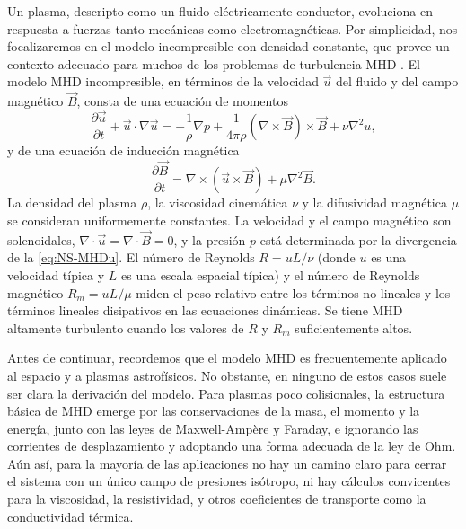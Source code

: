 Un plasma, descripto como un fluido eléctricamente conductor,
evoluciona en respuesta a fuerzas tanto mecánicas como
electromagnéticas. Por simplicidad, nos focalizaremos en el modelo
incompresible con densidad constante, que provee un contexto adecuado
para muchos de los problemas de turbulencia MHD
\cite{biskamp_magnetohydrodynamic_2003}. El modelo MHD incompresible,
en términos de la velocidad $\vec{u}$ del fluido y del campo magnético
$\vec{B}$, consta de una ecuación de momentos
\begin{equation}\label{eq:NS-MHDu}
  \frac{\partial \vec{u}}{\partial t} + \vec{u} \cdot \nabla\vec{u} = -\frac{1}{\rho} \nabla p + \frac{1}{4\pi\rho} \left(\nabla\times\vec{B}\right)\times\vec{B} + \nu \nabla^2 u,
\end{equation}
y de una ecuación de inducción magnética
\begin{equation}\label{eq:NS-MHDB}
  \frac{\partial \vec{B}}{\partial t} = \nabla \times \left(\vec{u}\times\vec{B}\right) + \mu \nabla^2 \vec{B}.
\end{equation}
La densidad del plasma $\rho$, la viscosidad cinemática $\nu$ y la
difusividad magnética $\mu$ se consideran uniformemente constantes. La
velocidad y el campo magnético son solenoidales,
$\nabla\cdot\vec{u} = \nabla\cdot\vec{B} = 0$, y la presión $p$ está
determinada por la divergencia de la \cref{eq:NS-MHDu}. El número de
Reynolds $R = uL/\nu$ (donde $u$ es una velocidad típica y $L$ es una
escala espacial típica) y el número de Reynolds magnético
$R_m = uL/\mu$ miden el peso relativo entre los términos no lineales y
los términos lineales disipativos en las ecuaciones dinámicas. Se
tiene MHD altamente turbulento cuando los valores de $R$ y $R_m$
suficientemente altos.

Antes de continuar, recordemos que el modelo MHD es frecuentemente
aplicado al espacio y a plasmas astrofísicos. No obstante, en ninguno
de estos casos suele ser clara la derivación del modelo. Para plasmas
poco colisionales, la estructura básica de MHD emerge por las
conservaciones de la masa, el momento y la energía, junto con las
leyes de Maxwell-Ampère y Faraday, e ignorando las corrientes de
desplazamiento y adoptando una forma adecuada de la ley de Ohm. Aún
así, para la mayoría de las aplicaciones no hay un camino claro para
cerrar el sistema con un único campo de presiones isótropo, ni hay
cálculos convicentes para la viscosidad, la resistividad, y otros
coeficientes de transporte como la conductividad térmica.

